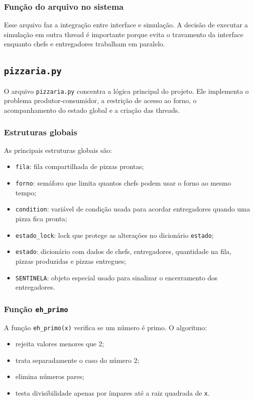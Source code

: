 \documentclass[12pt,a4paper]{article}
\begin{document}
\subsubsection{Fun\c{c}\~ao do arquivo no sistema}
Esse arquivo faz a integra\c{c}\~ao entre interface e simula\c{c}\~ao. A decis\~ao de executar a simula\c{c}\~ao em outra thread \'e importante porque evita o travamento da interface enquanto chefs e entregadores trabalham em paralelo.

\subsection{\texttt{pizzaria.py}}
O arquivo \texttt{pizzaria.py} concentra a l\'ogica principal do projeto. Ele implementa o problema produtor-consumidor, a restri\c{c}\~ao de acesso ao forno, o acompanhamento do estado global e a cria\c{c}\~ao das threads.

\subsubsection{Estruturas globais}
As principais estruturas globais s\~ao:
\begin{itemize}
    \item \texttt{fila}: fila compartilhada de pizzas prontas;
    \item \texttt{forno}: sem\'aforo que limita quantos chefs podem usar o forno ao mesmo tempo;
    \item \texttt{condition}: vari\'avel de condi\c{c}\~ao usada para acordar entregadores quando uma pizza fica pronta;
    \item \texttt{estado\_lock}: lock que protege as altera\c{c}\~oes no dicion\'ario \texttt{estado};
    \item \texttt{estado}: dicion\'ario com dados de chefs, entregadores, quantidade na fila, pizzas produzidas e pizzas entregues;
    \item \texttt{SENTINELA}: objeto especial usado para sinalizar o encerramento dos entregadores.
\end{itemize}

\subsubsection{Fun\c{c}\~ao \texttt{eh\_primo}}
A fun\c{c}\~ao \texttt{eh\_primo(x)} verifica se um n\'umero \'e primo. O algoritmo:
\begin{itemize}
    \item rejeita valores menores que 2;
    \item trata separadamente o caso do n\'umero 2;
    \item elimina n\'umeros pares;
    \item testa divisibilidade apenas por \'impares at\'e a raiz quadrada de \texttt{x}.
\end{itemize}
\end{document}
